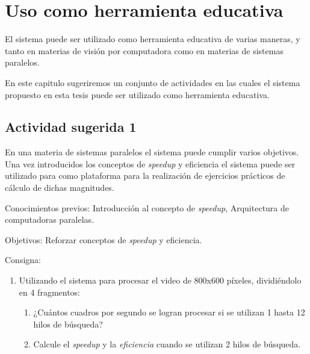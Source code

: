 
\section{Uso como herramienta educativa}

\label{usoEducativo}

El sistema puede ser utilizado como herramienta educativa de varias maneras, y
tanto en materias de visión por computadora como en materias de sistemas
paralelos.

En este capitulo sugeriremos un conjunto de actividades en las cuales el
sistema propuesto en esta tesis puede ser utilizado como herramienta educativa.

\subsection{Actividad sugerida 1}

En una materia de sistemas paralelos el sistema puede cumplir varios objetivos.
Una vez introducidos los conceptos de \emph{speedup} y eficiencia el sistema
puede ser utilizado para como plataforma para la realización de ejercicios
prácticos de cálculo de dichas magnitudes.

\begin{description}

	\item{Conocimientos previos}: Introducción al concepto de
		\emph{speedup}, Arquitectura de computadoras paralelas.

	\item{Objetivos}: Reforzar conceptos de \emph{speedup} y eficiencia.

	\item{Consigna}: \begin{enumerate}

	\item{Utilizando el sistema para procesar el video de 800x600 píxeles,
		dividiéndolo en 4 fragmentos:

\begin{enumerate}

	\item{¿Cuántos cuadros por segundo se logran procesar si se utilizan 1
		hasta 12 hilos de búsqueda?}

	\item{Calcule el \emph{speedup} y la \emph{eficiencia} cuando se
		utilizan 2 hilos de búsqueda.}

\end{enumerate}}

\end{enumerate}

\end{description}

